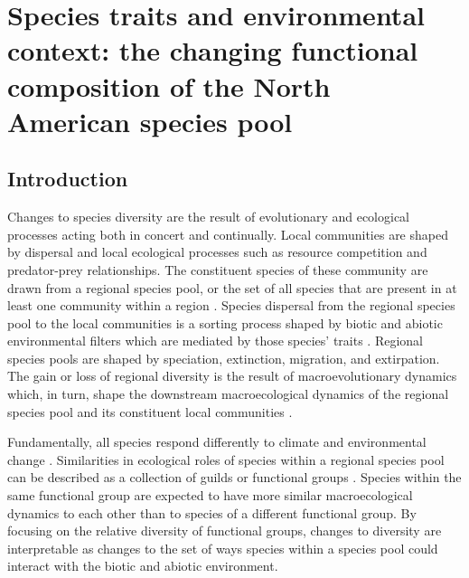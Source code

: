 \chapter{Species traits and environmental context: the changing functional composition of the North American species pool} \label{ch:coping}

\section*{Introduction}
Changes to species diversity are the result of evolutionary and ecological processes acting both in concert and continually. Local communities are shaped by dispersal and local ecological processes such as resource competition and predator-prey relationships. The constituent species of these community are drawn from a regional species pool, or the set of all species that are present in at least one community within a region \citep{Mittelbach2015a,Urban2008,Harrison2008}. Species dispersal from the regional species pool to the local communities is a sorting process shaped by biotic and abiotic environmental filters which are mediated by those species' traits \citep{Shipley2006,Elith2009,Urban2008,Loeuille2008,Cottenie2005,Harrison2008}. Regional species pools are shaped by speciation, extinction, migration, and extirpation. The gain or loss of regional diversity is the result of macroevolutionary dynamics which, in turn, shape the downstream macroecological dynamics of the regional species pool and its constituent local communities \citep{Urban2008,Mittelbach2015a,Harrison2008}. 

Fundamentally, all species respond differently to climate and environmental change \citep{Blois2009}. Similarities in ecological roles of species within a regional species pool can be described as a collection of guilds or functional groups \citep{Valentine1969,Bambach1977,Brown1989,Simberloff1991a,Wilson1999}. Species within the same functional group are expected to have more similar macroecological dynamics to each other than to species of a different functional group. By focusing on the relative diversity of functional groups, changes to diversity are interpretable as changes to the set of ways species within a species pool could interact with the biotic and abiotic environment. 


